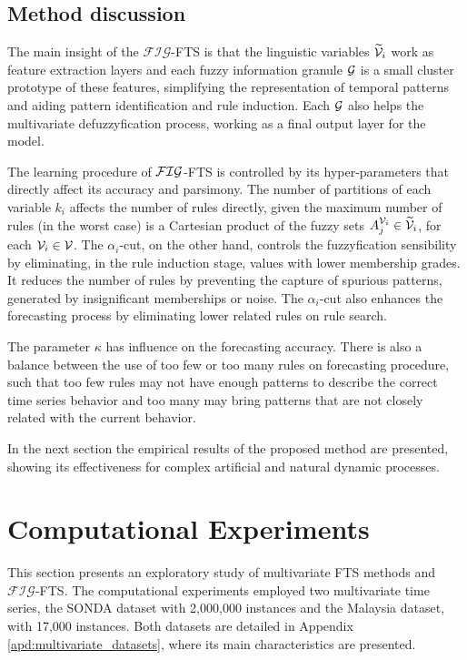 \subsection{Method discussion}
\label{sec:fig_discussion}

The main insight of the $\mathcal{FIG}$-FTS is that the linguistic variables $\widetilde{\mathcal{V}}_i$ work as feature extraction layers and each fuzzy information granule $\mathcal{G}$ is a small cluster prototype of these features, simplifying the representation of temporal patterns and aiding pattern identification and rule induction. Each $\mathcal{G}$ also helps the multivariate defuzzyfication process, working as a final output layer for the model.

The learning procedure of $\mathcal{FIG}$-FTS is controlled by its hyper-parameters that directly affect its accuracy and parsimony. The number of partitions of each variable $k_i$ affects the number of rules directly, given the maximum number of rules (in the worst case) is a Cartesian product of the fuzzy sets $A_j^{\mathcal{V}_i} \in \widetilde{\mathcal{V}}_i$, for each $\mathcal{V}_i \in \mathcal{V}$. The $\alpha_i$-cut, on the other hand, controls the fuzzyfication sensibility by eliminating, in  the rule induction stage, values with lower membership grades. It reduces the number of rules by preventing the capture of spurious patterns, generated by insignificant memberships or noise. The $\alpha_i$-cut also enhances the forecasting process by eliminating lower related rules on rule search.

The parameter $\kappa$ has influence on the forecasting accuracy. There is also a balance between the use of too few or too many rules on forecasting procedure, such that too few rules may not have enough patterns to describe the correct time series behavior and too many may bring patterns that are not closely related with the current behavior.

In the next section the empirical results of the proposed method are presented, showing its effectiveness for complex artificial and natural dynamic processes.

\section{Computational Experiments}

This section presents an exploratory study of multivariate FTS methods and $\mathcal{FIG}$-FTS. The computational experiments employed two multivariate time series, the SONDA dataset with 2,000,000 instances and the Malaysia dataset, with 17,000 instances. Both datasets are detailed in Appendix \ref{apd:multivariate_datasets}, where its main characteristics are presented.

